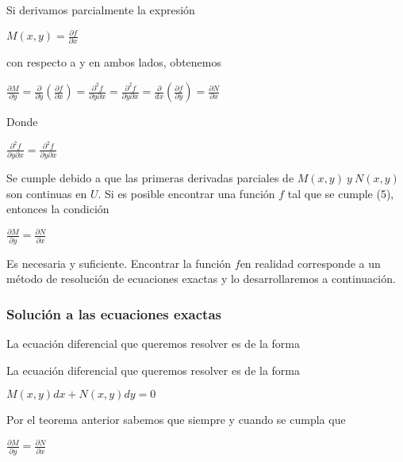 \documentclass[l etterpaper,11pt]{article}
\begin{document}
Si derivamos parcialmente la expresión\\
\begin{center}

$M(x,y)=\frac{\partial f}{\partial x}$
\end{center}

con respecto a y en ambos lados, obtenemos
\begin{center}

$\frac{\partial M}{\partial y}=\frac{\partial}{\partial y}(\frac{\partial f}{\partial x})=\frac{\partial^2f}{\partial y\partial x}=\frac{\partial^2f}{\partial y\partial x}=\frac{\partial}{dx}(\frac{\partial f}{\partial y})=\frac{\partial N}{\partial x}$
\end{center}

Donde
\begin{center}

$\frac{\partial^2f}{\partial y\partial x}=\frac{\partial^2f}{\partial y\partial x}$\\

\end{center}

Se cumple debido a que las primeras derivadas parciales de $ M(x,y)\ y\ N(x,y) $ son continuas en $ U.$
Si es posible encontrar una función $f$ tal que se cumple (5), entonces la condición
\begin{center}

 $\frac{\partial M}{\partial y}=\frac{\partial N}{\partial x}$\\
\end{center}

Es necesaria y suficiente. Encontrar la función $f $en realidad corresponde a un método de resolución de ecuaciones exactas y lo desarrollaremos a continuación.





\subsubsection{Solución a las ecuaciones exactas}


La ecuación diferencial que queremos resolver es de la forma

La ecuación diferencial que queremos resolver es de la forma
\begin{center}

$M(x,y)dx+N(x,y)dy=0$\\
\end{center}

Por el teorema anterior sabemos que siempre y cuando se cumpla que
\begin{center}

$\frac{\partial M}{\partial y}=\frac{\partial N}{\partial x}$\\
\end{center}
\end{document}

